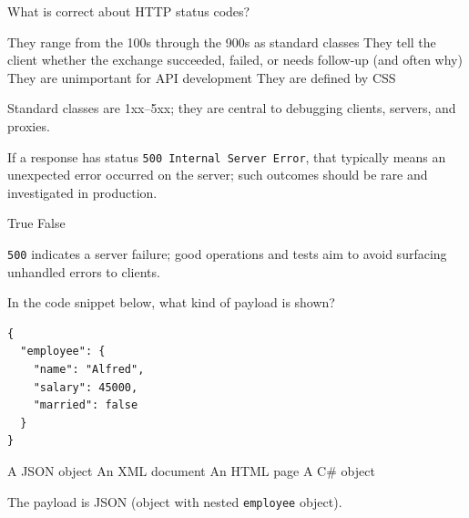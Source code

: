 \question[4]
What is correct about HTTP status codes?
\begin{choices}
  \choice They range from the 100s through the 900s as standard classes
  \CorrectChoice They tell the client whether the exchange succeeded, failed, or needs follow-up (and often why)
  \choice They are unimportant for API development
  \choice They are defined by CSS
\end{choices}
\begin{solution}
  Standard classes are 1xx--5xx; they are central to debugging clients, servers, and proxies.
\end{solution}

\question[4]
If a response has status \texttt{500 Internal Server Error}, that typically means an unexpected error occurred on the server; such outcomes should be rare and investigated in production.
\begin{choices}
  \CorrectChoice True
  \choice False
\end{choices}
\begin{solution}
  \texttt{500} indicates a server failure; good operations and tests aim to avoid surfacing unhandled errors to clients.
\end{solution}


\newpage

\question[4]
In the code snippet below, what kind of payload is shown?
\begin{lstlisting}[style=http]
{
  "employee": {
    "name": "Alfred",
    "salary": 45000,
    "married": false
  }
}
\end{lstlisting}
\begin{choices}
  \CorrectChoice A JSON object
  \choice An XML document
  \choice An HTML page
  \choice A C\# object
\end{choices}
\begin{solution}
  The payload is JSON (object with nested \texttt{employee} object).
\end{solution}



